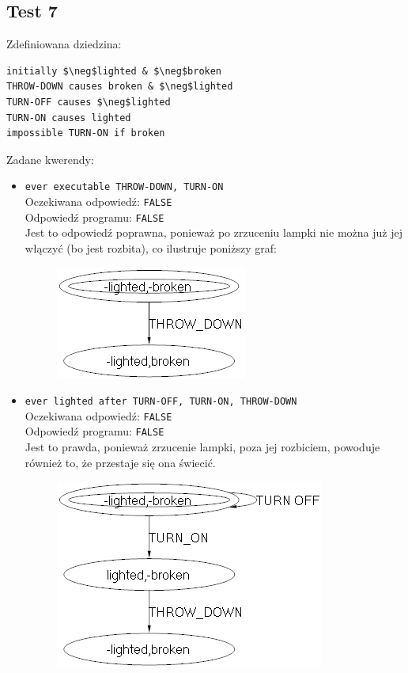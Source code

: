 \documentclass{article}
\begin{document}
\newpage
\subsection{Test 7}

Zdefiniowana dziedzina:
\bigskip
{}
\begin{lstlisting}[mathescape=true]
initially $\neg$lighted & $\neg$broken
THROW-DOWN causes broken & $\neg$lighted
TURN-OFF causes $\neg$lighted
TURN-ON causes lighted
impossible TURN-ON if broken
\end{lstlisting}

\vspace{1cm}

Zadane kwerendy:
\begin{itemize}
    \item {\large\texttt{ever executable THROW-DOWN, TURN-ON}}\\
	Oczekiwana odpowiedź: \texttt{FALSE}\\
    Odpowiedź programu: \texttt{FALSE}\\
    Jest to odpowiedź poprawna, ponieważ po zrzuceniu lampki nie można już jej włączyć (bo jest rozbita), co ilustruje poniższy graf:
    \begin{figure}[H]
    \centering
    \includegraphics[scale=0.5]{7_1}
    \end{figure}
	
    \item {\large\texttt{ever lighted after TURN-OFF, TURN-ON, THROW-DOWN}}\\
	Oczekiwana odpowiedź: \texttt{FALSE}\\
    Odpowiedź programu: \texttt{FALSE}\\
    Jest to prawda, ponieważ zrzucenie lampki, poza jej rozbiciem, powoduje również to, że przestaje się ona świecić.
    \begin{figure}[H]
    \centering
    \includegraphics[scale=0.5]{7_2}
    \end{figure}
    

\end{itemize}
\end{document}
